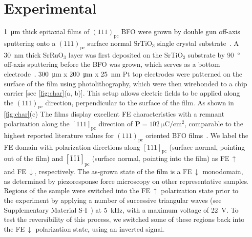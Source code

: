 \documentclass[aps,prb,twocolumn,showpacs,superscriptaddress, longbibliography, 10pt]{revtex4-1}
\begin{document}
\section{Experimental}

\SI{1}{\micro\metre} thick epitaxial films of $(111)_\mathrm{pc}$ BFO were grown by double gun off-axis sputtering onto a $(111)_\mathrm{pc}$ surface normal SrTiO$_3$ single crystal substrate~\cite{das2006synthesis}. A \SI{30}{\nano\metre} thick SrRuO$_3$ layer was first deposited on the SrTiO$_3$ substrate by \SI{90}{\degree} off-axis sputtering before the BFO was grown, which serves as a bottom electrode~\cite{eom1992single}. \SI{300}{\micro\metre} x \SI{200}{\micro\metre}  x \SI{25}{\nano\metre} Pt top electrodes were patterned on the surface of the film using photolithography, which were then wirebonded to a chip carrier [see \cref{fig:char}(a, b)]. This setup allows electric fields to be applied along the $(111)_\mathrm{pc}$ direction, perpendicular to the surface of the film. As shown in \cref{fig:char}(c) The films display excellent FE characteristics with a remnant polarization along the $[111]_\mathrm{pc}$ direction of $\mathbf{P} = \SI{102}{\micro\coulomb/\cm^2}$, comparable to the highest reported literature values for $(111)_\mathrm{pc}$ oriented BFO films~\cite{das2006synthesis, li2004dramatically, bai2005destruction}. We label the FE domain with polarization directions along $[111]_\mathrm{pc}$ (surface normal, pointing out of the film) and $[\bar{1}\bar{1}\bar{1}]_\mathrm{pc}$ (surface normal, pointing into the film) as FE\,$\uparrow$ and FE\,$\downarrow$, respectively. The as-grown state of the film is a FE\,$\downarrow$ monodomain, as determined by piezoresponse force microscopy on other representative samples. Regions of the sample were switched into the FE\,$\uparrow$ polarization state prior to the experiment by applying a number of successive triangular waves (see Supplementary Material S-I~\cite{Suppl}) at \SI{5}{\kilo\hertz}, with a maximum voltage of \SI{22}{\volt}. To test the reversibility of this process, we switched some of these regions back into the FE\,$\downarrow$ polarization state, using an inverted signal.
\end{document}
